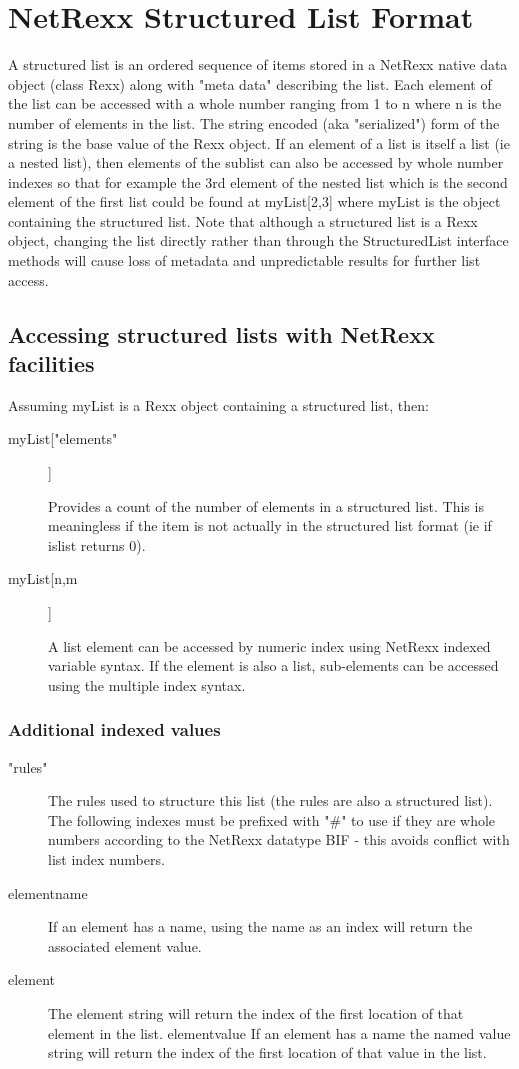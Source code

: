 \section{NetRexx Structured List Format}
A structured list is an ordered sequence of items stored in a NetRexx
native data object (class Rexx) along with "meta data" describing the
list. Each element of the list can be accessed with a whole number
ranging from 1 to n where n is the number of elements in the list. The
string encoded (aka "serialized") form of the string is the base value
of the Rexx object. If an element of a list is itself a list (ie a
nested list), then elements of the sublist can also be accessed by
whole number indexes so that for example the 3rd element of the nested
list which is the second element of the first list could be found at
myList[2,3] where myList is the object containing the structured
list. Note that although a structured list is a Rexx object, changing
the list directly rather than through the StructuredList interface
methods will cause loss of metadata and unpredictable results for
further list access.

\subsection{Accessing structured lists with NetRexx facilities}
Assuming myList is a Rexx object containing a structured list, then:
\begin{description}


\item[myList["elements"]]

Provides a count of the number of elements in a structured list. This is meaningless if the item is not actually in the structured list format (ie if islist returns 0). 

\item[myList[n,m]]

A list element can be accessed by numeric index using NetRexx indexed variable syntax. If the element is also a list, sub-elements can be accessed using the multiple index syntax.
\end{description}

\subsubsection{Additional indexed values}
\begin{description}
\item["rules"]
The rules used to structure this list (the rules are also a structured list).
The following indexes must be prefixed with "\#" to use if they are whole numbers according to the NetRexx datatype BIF - this avoids conflict with list index numbers.
\item[elementname]
If an element has a name, using the name as an index will return the associated element value.

\item[element]
The element string will return the index of the first location of that element in the list.
elementvalue
If an element has a name the named value string will return the index of the first location of that value in the list.
\end{description}

